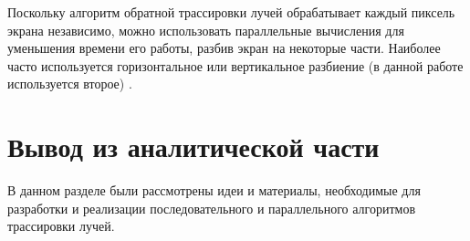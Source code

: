 Поскольку алгоритм обратной трассировки лучей обрабатывает каждый пиксель экрана независимо, можно использовать параллельные вычисления для уменьшения времени его работы, разбив экран на некоторые части. Наиболее часто используется горизонтальное или вертикальное разбиение (в данной работе используется второе) \cite{article_paral}.


\section{Вывод из аналитической части}
В данном разделе были рассмотрены идеи и материалы, необходимые для разработки и реализации последовательного и параллельного алгоритмов трассировки лучей.

